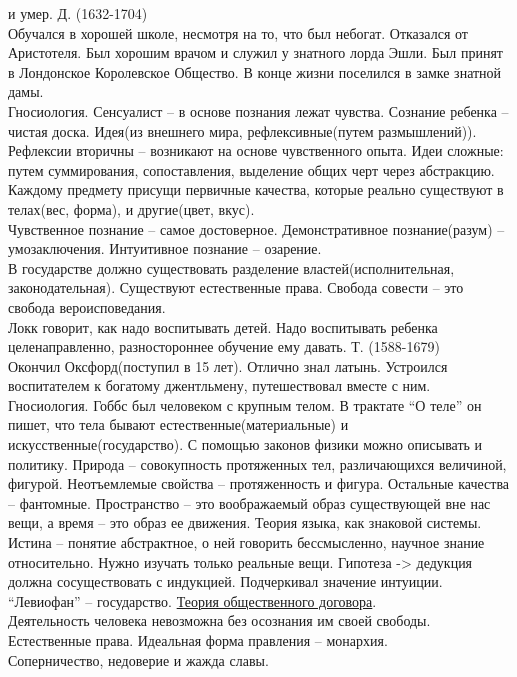 \documentclass[a4paper,12pt]{report} %
\begin{document}
\begin{itemize}
\begin{itemize}
и умер.
 Д. (1632-1704)\\
Обучался в хорошей школе, несмотря на то, что был небогат. Отказался
от Аристотеля. Был хорошим врачом и служил у знатного лорда Эшли. Был
принят в Лондонское Королевское Общество. В конце жизни поселился в
замке знатной дамы.\\
Гносиология. Сенсуалист -- в основе познания лежат чувства. Сознание
ребенка -- чистая доска. Идея(из внешнего мира, рефлексивные(путем
размышлений)). Рефлексии вторичны -- возникают на основе чувственного
опыта. Идеи сложные: путем суммирования, сопоставления, выделение
общих черт через абстракцию. Каждому предмету присущи первичные
качества, которые реально существуют в телах(вес, форма), и
другие(цвет, вкус).\\
 Чувственное познание -- самое достоверное. Демонстративное
 познание(разум) -- умозаключения. Интуитивное познание -- озарение.\\
В государстве должно существовать разделение властей(исполнительная,
законодательная). Существуют естественные права. Свобода совести --
это свобода вероисповедания.\\
Локк говорит, как надо воспитывать детей. Надо воспитывать ребенка
целенаправленно, разностороннее обучение ему давать.
 Т. (1588-1679)\\
Окончил Оксфорд(поступил в 15 лет). Отлично знал латынь. Устроился
воспитателем к богатому джентльмену, путешествовал вместе с ним.\\
Гносиология. Гоббс был человеком с крупным телом. В трактате ``О
теле'' он пишет, что тела бывают естественные(материальные) и
искусственные(государство). С помощью законов физики можно описывать и
политику. Природа -- совокупность протяженных тел, различающихся
величиной, фигурой. Неотъемлемые свойства -- протяженность и
фигура. Остальные качества -- фантомные. Пространство -- это
воображаемый образ существующей вне нас вещи, а время -- это образ ее
движения. Теория языка, как знаковой системы. Истина -- понятие
абстрактное, о ней говорить бессмысленно, научное знание
относительно. Нужно изучать только реальные вещи. Гипотеза -> дедукция
должна сосуществовать с индукцией. Подчеркивал значение интуиции.\\
``Левиофан'' -- государство. \underline{Теория общественного
  договора}.\\
Деятельность человека невозможна без осознания им своей
свободы. Естественные права. Идеальная форма правления -- монархия.\\
Соперничество, недоверие и жажда славы.\\

\end{itemize}
\end{itemize}
\end{document}
